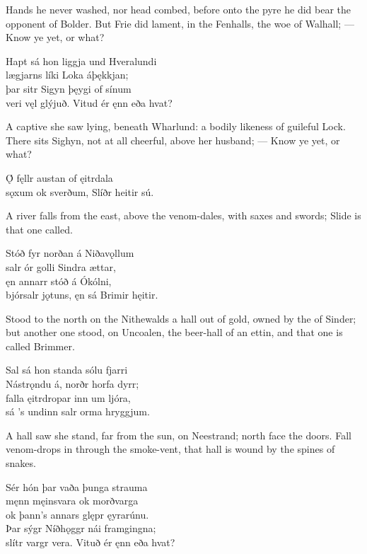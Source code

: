 \bvb Hands he never washed, nor head combed, before onto the pyre he did bear the opponent of Bolder. But Frie did lament, in the Fenhalls, the woe of Walhall; — Know ye yet, or what?\evb

\bva Hapt sá hon liggja \hld und Hveralundi \\%
lægjarns líki \hld Loka áþękkjan; \\%
þar sitr Sigyn \hld þęygi of sínum \\%
veri vęl glýjuð. \hld Vitud ér ęnn eða hvat?\eva

\bvb A captive she saw lying, beneath Wharlund: a bodily likeness of guileful Lock. There sits Sighyn, not at all cheerful, above her husband; — Know ye yet, or what?\evb

\bva Ǫ́ fęllr austan \hld of ęitrdala \\%
sǫxum ok sverðum, \hld Slíðr heitir sú.\eva

\bvb A river falls from the east, above the venom-dales, with saxes and swords; Slide is that one called.\evb

\bva Stóð fyr norðan \hld á Niðavǫllum \\%
salr ór golli \hld Sindra ættar, \\%
ęn annarr stóð \hld á Ókólni, \\%
bjórsalr jǫtuns, \hld ęn sá Brimir hęitir.\eva

\bvb Stood to the north on the Nithewalds a hall out of gold, owned by the  of Sinder; but another one stood, on Uncoalen, the beer-hall of an ettin, and that one is called Brimmer.\evb

\bva Sal sá hon standa \hld sólu fjarri \\%
Nástrǫndu á, \hld norðr horfa dyrr; \\%
falla ęitrdropar \hld inn um ljóra, \\%
sá ’s undinn salr \hld orma hryggjum.\eva

\bvb A hall saw she stand, far from the sun, on Neestrand; north face the doors. Fall venom-drops in through the smoke-vent, that hall is wound by the spines of snakes.\evb

\bva Sér hón þar vaða \hld þunga strauma \\%
męnn męinsvara \hld ok morðvarga \\%
ok þann’s annars glępr \hld ęyrarúnu. \\%
Þar sýgr Níðhǫggr \hld nái framgingna; \\%
slítr vargr vera. \hld Vituð ér ęnn eða hvat?\eva

